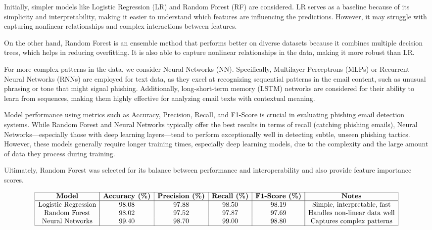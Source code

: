 \documentclass{article}
\begin{document}
Initially, simpler models like Logistic Regression (LR) and Random Forest (RF) are considered. LR serves as a baseline because of its simplicity and interpretability, making it easier to understand which features are influencing the predictions. However, it may struggle with capturing nonlinear relationships and complex interactions between features.

On the other hand, Random Forest is an ensemble method that performs better on diverse datasets because it combines multiple decision trees, which helps in reducing overfitting. It is also able to capture nonlinear relationships in the data, making it more robust than LR.

For more complex patterns in the data, we consider Neural Networks (NN). Specifically, Multilayer Perceptrons (MLPs) or Recurrent Neural Networks (RNNs) are employed for text data, as they excel at recognizing sequential patterns in the email content, such as unusual phrasing or tone that might signal phishing. Additionally, long-short-term memory (LSTM) networks are considered for their ability to learn from sequences, making them highly effective for analyzing email texts with contextual meaning.

Model performance using metrics such as Accuracy, Precision, Recall, and F1-Score is crucial in evaluating phishing email detection systems. While Random Forest and Neural Networks typically offer the best results in terms of recall (catching phishing emails), Neural Networks—especially those with deep learning layers—tend to perform exceptionally well in detecting subtle, unseen phishing tactics. However, these models generally require longer training times, especially deep learning models, due to the complexity and the large amount of data they process during training.

Ultimately, Random Forest was selected for its balance between performance and interoperability and also provide feature importance scores.

\[
\begin{array}{|c|c|c|c|c|c|}
\hline
\textbf{Model} & \textbf{Accuracy (\%)} & \textbf{Precision (\%)} & \textbf{Recall (\%)} & \textbf{F1-Score (\%)} & \textbf{Notes} \\
\hline
\text{Logistic Regression} & 98.08 & 97.88 & 98.50 & 98.19 & \text{Simple, interpretable, fast} \\
\text{Random Forest} & 98.02 & 97.52 & 97.87 & 97.69 & \text{Handles non-linear data well} \\
\text{Neural Networks} & 99.40 & 98.70 & 99.00 & 98.80 & \text{Captures complex patterns} \\
\hline
\end{array}
\]
\newpage
\end{document}
